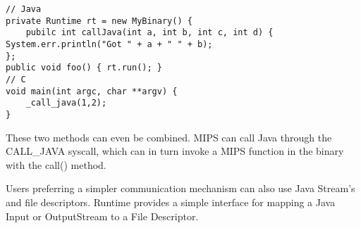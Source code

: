 \documentclass{acmconf}
\begin{document}
{\footnotesize\begin{verbatim}
// Java
private Runtime rt = new MyBinary() {
    pubilc int callJava(int a, int b, int c, int d) { System.err.println("Got " + a + " " + b);
};
public void foo() { rt.run(); }
// C
void main(int argc, char **argv) {
    _call_java(1,2);
}
\end{verbatim}}

These two methods can even be combined. MIPS can call Java through the
CALL\_JAVA syscall, which can in turn invoke a MIPS function in the binary
with the call() method.

Users preferring a simpler communication mechanism can also use Java
Stream's and file descriptors. Runtime provides a simple interface for
mapping a Java Input or OutputStream to a File Descriptor.







      
%
\end{document}
